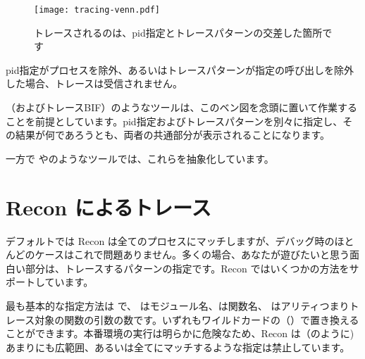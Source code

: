\begin{figure}
  \texttt{[image: tracing-venn.pdf]}%
  \centering%
  \caption{トレースされるのは、pid指定とトレースパターンの交差した箇所です}%
   \label{fig:tracing-venn}
\end{figure}

pid指定がプロセスを除外、あるいはトレースパターンが指定の呼び出しを除外した場合、トレースは受信されません。

（およびトレースBIF）のようなツールは、このベン図を念頭に置いて作業することを前提としています。pid指定およびトレースパターンを別々に指定し、その結果が何であろうとも、両者の共通部分が表示されることになります。

\FloatBarrier
一方で やのようなツールでは、これらを抽象化しています。

\section{Recon によるトレース}

デフォルトでは Recon は全てのプロセスにマッチしますが、デバッグ時のほとんどのケースはこれで問題ありません。多くの場合、あなたが遊びたいと思う面白い部分は、トレースするパターンの指定です。Recon ではいくつかの方法をサポートしています。

最も基本的な指定方法は で、 はモジュール名、は関数名、 はアリティつまりトレース対象の関数の引数の数です。いずれもワイルドカードの（）で置き換えることができます。本番環境の実行は明らかに危険なため、Recon は（のように)あまりにも広範囲、あるいは全てにマッチするような指定は禁止しています。

